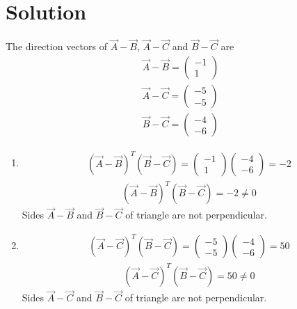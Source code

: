 \documentclass[journal,12pt,twocolumn]{IEEEtran}
\newcommand{\myvec}[1]{\ensuremath{\begin{pmatrix}#1\end{pmatrix}}}
\begin{document}
\section{Solution}
The direction vectors of $\vec{A}-\vec{B}$, $\vec{A}-\vec{C}$ and $\vec{B}-\vec{C}$ are
\begin{align}
	\vec{A}-\vec{B} =\myvec{-1 \\ 1} \\
	\vec{A}-\vec{C} =\myvec{-5 \\ -5}\\
	\vec{B}-\vec{C} =\myvec{-4 \\ -6} 
\end{align}
\begin{enumerate}
\item \begin{align} {(\vec{A}-\vec{B})}^T  (\vec{B}-\vec{C})  =   \myvec{ -1 \\ 1 }  \myvec{ -4 \\ -6 } = -2 \end{align}
\begin{align}{(\vec{A}-\vec{B})}^T  (\vec{B}-\vec{C}) = -2 \neq 0 \end{align}
Sides $\vec{A}-\vec{B}$ and $\vec{B}-\vec{C}$ of triangle are not perpendicular.

\item \begin{align}{(\vec{A}-\vec{C})}^T  (\vec{B}-\vec{C}) =  \myvec{ -5 \\ -5 }  \myvec{ -4 \\ -6 } = 50\end{align}
\begin {align}{(\vec{A}-\vec{C})}^T  (\vec{B}-\vec{C}) = 50 \neq 0 \end {align}
Sides $\vec{A}-\vec{C}$ and $\vec{B}-\vec{C}$ of triangle are not perpendicular.


\end{enumerate}
\end{document}
